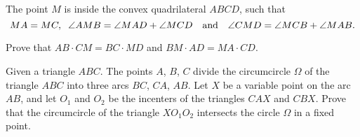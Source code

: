 \item[\textbf{G7.}]The point $M$ is inside the convex quadrilateral $ABCD$,  such that\[ MA = MC, \hspace{0,2cm} \angle{AMB} = \angle{MAD} + \angle{MCD} \quad \textnormal{and} \quad \angle{CMD} = \angle{MCB} + \angle{MAB}. \]

Prove that $AB \cdot CM = BC \cdot MD$ and $BM \cdot AD = MA \cdot CD.$

\item[\textbf{G8.}]Given a triangle $ABC$. The points $A$,  $B$,  $C$ divide the circumcircle $\Omega$ of the triangle $ABC$ into three arcs $BC$,  $CA$,  $AB$. Let $X$ be a variable point on the arc $AB$,  and let $O_{1}$ and $O_{2}$ be the incenters of the triangles $CAX$ and $CBX$. Prove that the circumcircle of the triangle $XO_{1}O_{2}$ intersects the circle $\Omega$ in a fixed point.

